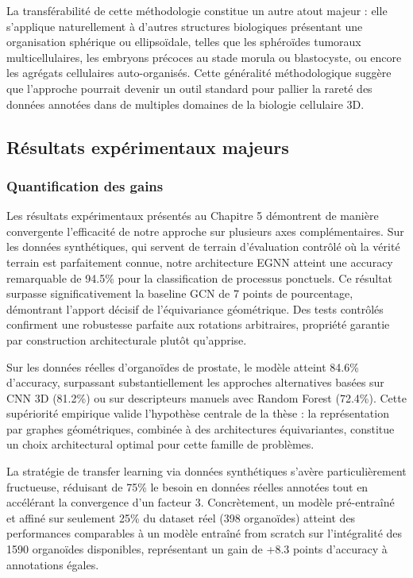La transférabilité de cette méthodologie constitue un autre atout majeur : elle s'applique naturellement à d'autres structures biologiques présentant une organisation sphérique ou ellipsoïdale, telles que les sphéroïdes tumoraux multicellulaires, les embryons précoces au stade morula ou blastocyste, ou encore les agrégats cellulaires auto-organisés. Cette généralité méthodologique suggère que l'approche pourrait devenir un outil standard pour pallier la rareté des données annotées dans de multiples domaines de la biologie cellulaire 3D.

\subsection{Résultats expérimentaux majeurs}

\subsubsection{Quantification des gains}

Les résultats expérimentaux présentés au Chapitre 5 démontrent de manière convergente l'efficacité de notre approche sur plusieurs axes complémentaires. Sur les données synthétiques, qui servent de terrain d'évaluation contrôlé où la vérité terrain est parfaitement connue, notre architecture EGNN atteint une accuracy remarquable de 94.5\% pour la classification de processus ponctuels. Ce résultat surpasse significativement la baseline GCN de 7 points de pourcentage, démontrant l'apport décisif de l'équivariance géométrique. Des tests contrôlés confirment une robustesse parfaite aux rotations arbitraires, propriété garantie par construction architecturale plutôt qu'apprise.

Sur les données réelles d'organoïdes de prostate, le modèle atteint 84.6\% d'accuracy, surpassant substantiellement les approches alternatives basées sur CNN 3D (81.2\%) ou sur descripteurs manuels avec Random Forest (72.4\%). Cette supériorité empirique valide l'hypothèse centrale de la thèse : la représentation par graphes géométriques, combinée à des architectures équivariantes, constitue un choix architectural optimal pour cette famille de problèmes.

La stratégie de transfer learning via données synthétiques s'avère particulièrement fructueuse, réduisant de 75\% le besoin en données réelles annotées tout en accélérant la convergence d'un facteur 3. Concrètement, un modèle pré-entraîné et affiné sur seulement 25\% du dataset réel (398 organoïdes) atteint des performances comparables à un modèle entraîné from scratch sur l'intégralité des 1590 organoïdes disponibles, représentant un gain de +8.3 points d'accuracy à annotations égales.

